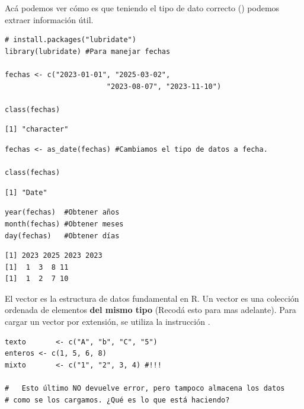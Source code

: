 \documentclass[8pt]{beamer}
\begin{document}
\begin{frame}[fragile]
	Ac\'a podemos ver c\'omo es que teniendo el tipo de dato correcto () podemos extraer informaci\'on \'util.
	
\begin{lstlisting}[style=RScript]
# install.packages("lubridate")
library(lubridate) #Para manejar fechas

fechas <- c("2023-01-01", "2025-03-02",
						"2023-08-07", "2023-11-10")

class(fechas)
\end{lstlisting}
\begin{lstlisting}[style=RConsole]
[1] "character"
\end{lstlisting}
\begin{lstlisting}[style=RScript]
fechas <- as_date(fechas) #Cambiamos el tipo de datos a fecha.

class(fechas)
\end{lstlisting}
\begin{lstlisting}[style=RConsole]
[1] "Date"
\end{lstlisting}
\begin{lstlisting}[style=RScript]
year(fechas)  #Obtener años
month(fechas) #Obtener meses
day(fechas)   #Obtener días
\end{lstlisting}
\begin{lstlisting}[style=RConsole]
[1] 2023 2025 2023 2023
[1]  1  3  8 11
[1]  1  2  7 10
\end{lstlisting}
\end{frame}







\begin{frame}[fragile]
	El vector es la estructura de datos fundamental en R. Un vector es una colección ordenada de elementos \textbf{del mismo tipo} (Recod\'a esto para mas adelante). Para cargar un vector por extensión, se utiliza la instrucción .
	
\begin{lstlisting}[style=RScript]
texto		<- c("A", "b", "C", "5")
enteros <- c(1, 5, 6, 8)
mixto		<- c("1", "2", 3, 4) #!!!

#   Esto último NO devuelve error, pero tampoco almacena los datos
# como se los cargamos. ¿Qué es lo que está haciendo?
\end{lstlisting}
\end{frame}
\end{document}
